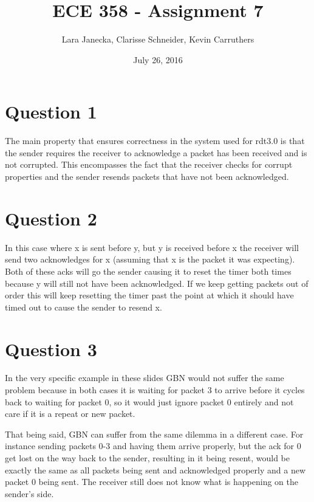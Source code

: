 \documentclass{article}
\begin{document}
\title{ECE 358 - Assignment 7}
\date{July 26, 2016}
\author{Lara Janecka, Clarisse Schneider, Kevin Carruthers}
\maketitle

\section{Question 1} %
\label{sec:question_1}
The main property that ensures correctness in the system used for rdt3.0 is that the sender requires the receiver to acknowledge a packet has been received and is not corrupted. This encompasses the fact that the receiver checks for corrupt properties and the sender resends packets that have not been acknowledged.

\section{Question 2} %
\label{sec:question_2}
In this case where x is sent before y, but y is received before x the receiver will send two acknowledges for x (assuming that x is the packet it was expecting). Both of these acks will go the sender causing it to reset the timer both times because y will still not have been acknowledged. If we keep getting packets out of order this will keep resetting the timer past the point at which it should have timed out to cause the sender to resend x. 

\section{Question 3} %
\label{sec:question_3}
In the very specific example in these slides GBN would not suffer the same problem because in both cases it is waiting for packet 3 to arrive before it cycles back to waiting for packet 0, so it would just ignore packet 0 entirely and not care if it is a repeat or new packet.

That being said, GBN can suffer from the same dilemma in a different case. For instance sending packets 0-3 and having them arrive properly, but the ack for 0 get lost on the way back to the sender, resulting in it being resent, would be exactly the same as all packets being sent and acknowledged properly and a new packet 0 being sent. The receiver still does not know what is happening on the sender's side. 
\end{document}
